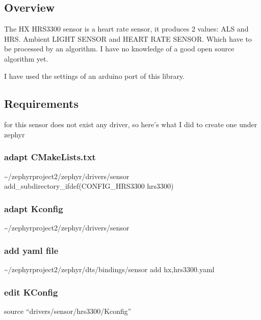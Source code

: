 \documentclass[letterpaper,10pt,english]{sphinxmanual}
\begin{document}
\begin{sphinxVerbatim}[commandchars=\\\{\}]
\end{sphinxVerbatim}


\subsection{Overview}
\label{\detokenize{drivers/hrs3300:overview}}
The HX HRS3300 sensor is a heart rate sensor, it produces 2 values: ALS and HRS. Ambient LIGHT SENSOR and HEART RATE SENSOR. Which have to be processed by an algorithm. I have no knowledge of a good open source algorithm yet.

I have used the settings of an arduino port of this library.

\noindent{}


\subsection{Requirements}
\label{\detokenize{drivers/hrs3300:requirements}}
for this sensor does not exist any driver, so here’s what I did to create one under zephyr


\subsubsection{adapt CMakeLists.txt}
\label{\detokenize{drivers/hrs3300:adapt-cmakelists-txt}}
\textasciitilde{}/zephyrproject\sphinxhyphen{}2/zephyr/drivers/sensor
add\_subdirectory\_ifdef(CONFIG\_HRS3300           hrs3300)


\subsubsection{adapt Kconfig}
\label{\detokenize{drivers/hrs3300:adapt-kconfig}}
\textasciitilde{}/zephyrproject\sphinxhyphen{}2/zephyr/drivers/sensor


\subsubsection{add yaml file}
\label{\detokenize{drivers/hrs3300:add-yaml-file}}
\textasciitilde{}/zephyrproject\sphinxhyphen{}2/zephyr/dts/bindings/sensor
add  hx,hrs3300.yaml


\subsubsection{edit KConfig}
\label{\detokenize{drivers/hrs3300:edit-kconfig}}
source “drivers/sensor/hrs3300/Kconfig”
\end{document}
